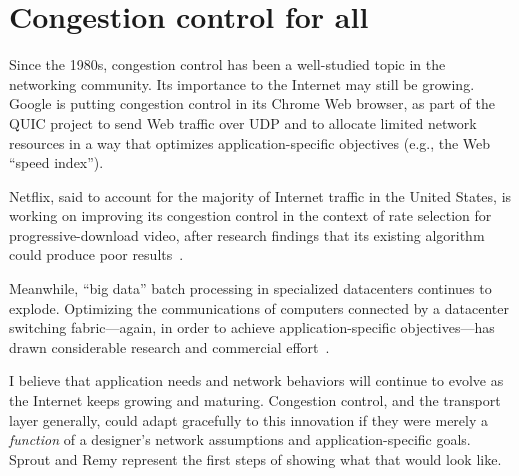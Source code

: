 
\section{Congestion control for all}

Since the 1980s, congestion control has been a well-studied topic in
the networking community. Its importance to the Internet may still be
growing. Google is putting congestion control in its Chrome Web
browser, as part of the QUIC project to send Web traffic over UDP and
to allocate limited network resources in a way that optimizes
application-specific objectives (e.g., the Web ``speed index'').

Netflix, said to account for the majority of Internet traffic in the
United States, is working on improving its congestion control in the
context of rate selection for progressive-download video, after
research findings that its existing algorithm could produce poor results~\cite{huang2012confused}.

Meanwhile, ``big data'' batch processing in specialized datacenters
continues to explode. Optimizing the communications of computers
connected by a datacenter switching fabric---again, in order to
achieve application-specific objectives---has drawn considerable
research and commercial effort~\cite{dctcp, pfabric}.

I believe that application needs and network behaviors will continue
to evolve as the Internet keeps growing and maturing. Congestion
control, and the transport layer generally, could adapt gracefully to
this innovation if they were merely a \emph{function} of a designer's
network assumptions and application-specific goals. Sprout and Remy
represent the first steps of showing what that would look
like.
